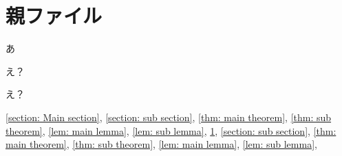 \documentclass[uplatex,dvipdfmx]{jsarticle}
\begin{document}
\section{親ファイル}\label{section: Main section}
あ
\begin{thm}\label{thm: main theorem}
  え？
\end{thm}
\begin{lem}\label{lem: main lemma}
  え？
\end{lem}



\autoref{section: Main section},
\autoref{section: sub section},
\autoref{thm: main theorem},
\autoref{thm: sub theorem},
\autoref{lem: main lemma},
\autoref{lem: sub lemma},
\ref{section: Main section},
\ref{section: sub section},
\ref{thm: main theorem},
\ref{thm: sub theorem},
\ref{lem: main lemma},
\ref{lem: sub lemma},
\end{document}
